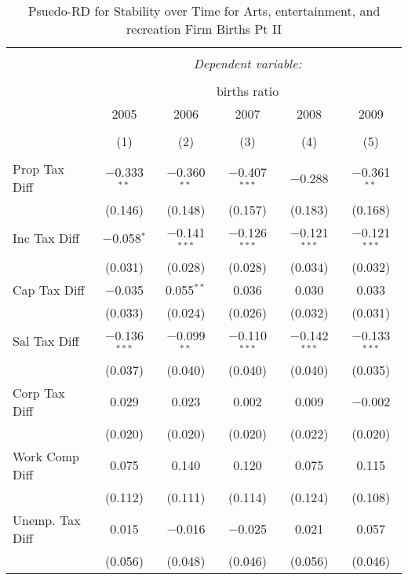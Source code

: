 
\begin{table}[!htbp] \centering 
  \caption{Psuedo-RD for Stability over Time for  Arts, entertainment, and recreation Firm Births Pt II} 
  \label{71year} 
\small 
\begin{tabular}{@{\extracolsep{5pt}}lccccc} 
\\[-1.8ex]\hline 
\hline \\[-1.8ex] 
 & \multicolumn{5}{c}{\textit{Dependent variable:}} \\ 
\cline{2-6} 
\\[-1.8ex] & \multicolumn{5}{c}{births ratio} \\ 
 & 2005 & 2006 & 2007 & 2008 & 2009 \\ 
\\[-1.8ex] & (1) & (2) & (3) & (4) & (5)\\ 
\hline \\[-1.8ex] 
 Prop Tax Diff & $-$0.333$^{**}$ & $-$0.360$^{**}$ & $-$0.407$^{***}$ & $-$0.288 & $-$0.361$^{**}$ \\ 
  & (0.146) & (0.148) & (0.157) & (0.183) & (0.168) \\ 
  Inc Tax Diff & $-$0.058$^{*}$ & $-$0.141$^{***}$ & $-$0.126$^{***}$ & $-$0.121$^{***}$ & $-$0.121$^{***}$ \\ 
  & (0.031) & (0.028) & (0.028) & (0.034) & (0.032) \\ 
  Cap Tax Diff & $-$0.035 & 0.055$^{**}$ & 0.036 & 0.030 & 0.033 \\ 
  & (0.033) & (0.024) & (0.026) & (0.032) & (0.031) \\ 
  Sal Tax Diff & $-$0.136$^{***}$ & $-$0.099$^{**}$ & $-$0.110$^{***}$ & $-$0.142$^{***}$ & $-$0.133$^{***}$ \\ 
  & (0.037) & (0.040) & (0.040) & (0.040) & (0.035) \\ 
  Corp Tax Diff & 0.029 & 0.023 & 0.002 & 0.009 & $-$0.002 \\ 
  & (0.020) & (0.020) & (0.020) & (0.022) & (0.020) \\ 
  Work Comp Diff & 0.075 & 0.140 & 0.120 & 0.075 & 0.115 \\ 
  & (0.112) & (0.111) & (0.114) & (0.124) & (0.108) \\ 
  Unemp. Tax Diff & 0.015 & $-$0.016 & $-$0.025 & 0.021 & 0.057 \\ 
  & (0.056) & (0.048) & (0.046) & (0.056) & (0.046) \\ 

\end{tabular}
\end{table}
